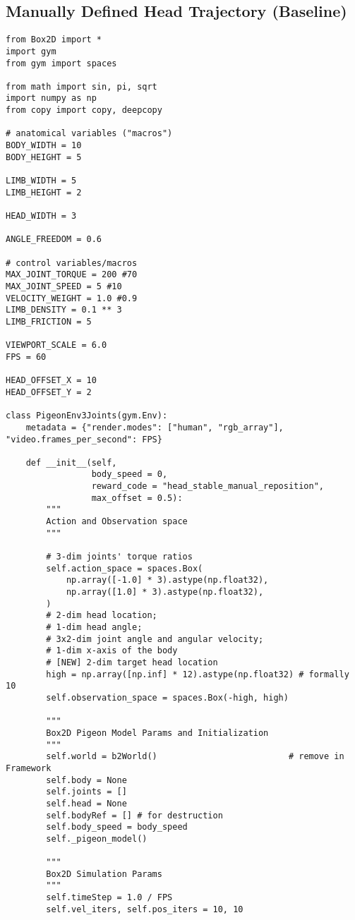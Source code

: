 \begin{itemize}
\subsection{Manually Defined Head Trajectory (Baseline)}
\begin{lstlisting}
from Box2D import *
import gym
from gym import spaces

from math import sin, pi, sqrt
import numpy as np
from copy import copy, deepcopy

# anatomical variables ("macros")
BODY_WIDTH = 10
BODY_HEIGHT = 5

LIMB_WIDTH = 5
LIMB_HEIGHT = 2

HEAD_WIDTH = 3

ANGLE_FREEDOM = 0.6

# control variables/macros
MAX_JOINT_TORQUE = 200 #70
MAX_JOINT_SPEED = 5 #10
VELOCITY_WEIGHT = 1.0 #0.9
LIMB_DENSITY = 0.1 ** 3
LIMB_FRICTION = 5

VIEWPORT_SCALE = 6.0
FPS = 60

HEAD_OFFSET_X = 10
HEAD_OFFSET_Y = 2

class PigeonEnv3Joints(gym.Env):
    metadata = {"render.modes": ["human", "rgb_array"], "video.frames_per_second": FPS}

    def __init__(self,
                 body_speed = 0,
                 reward_code = "head_stable_manual_reposition",
                 max_offset = 0.5):
        """
        Action and Observation space
        """

        # 3-dim joints' torque ratios
        self.action_space = spaces.Box(
            np.array([-1.0] * 3).astype(np.float32),
            np.array([1.0] * 3).astype(np.float32),
        )
        # 2-dim head location;
        # 1-dim head angle;
        # 3x2-dim joint angle and angular velocity;
        # 1-dim x-axis of the body
        # [NEW] 2-dim target head location
        high = np.array([np.inf] * 12).astype(np.float32) # formally 10
        self.observation_space = spaces.Box(-high, high)

        """
        Box2D Pigeon Model Params and Initialization
        """
        self.world = b2World()                          # remove in Framework
        self.body = None
        self.joints = []
        self.head = None
        self.bodyRef = [] # for destruction
        self.body_speed = body_speed
        self._pigeon_model()

        """
        Box2D Simulation Params
        """
        self.timeStep = 1.0 / FPS
        self.vel_iters, self.pos_iters = 10, 10


\end{lstlisting}
\end{itemize}
